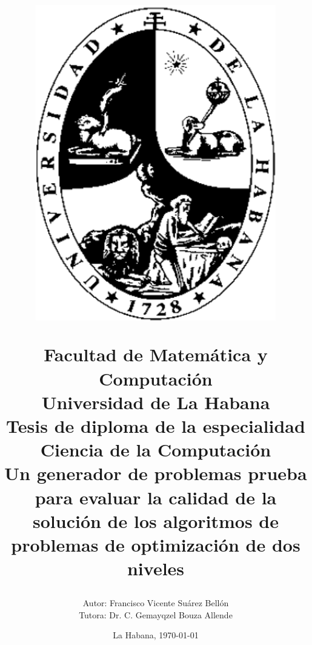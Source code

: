 \begin{titlepage}
	
	\title{\vspace*{-70pt}
		\begin{figure}
			\includegraphics[scale=0.2]{img/logo.png}
		\end{figure} 
		\vspace*{10pt}Facultad de Matemática y Computación \\
		Universidad de La Habana \\
		\vspace*{20pt}	
		Tesis de diploma de la especialidad \\ 
		Ciencia de la Computación \\
		
		\vspace*{20pt}
		Un generador de problemas prueba para evaluar la calidad de la solución de los algoritmos de problemas de optimización de dos niveles 
		\author{{\large Autor: Francisco Vicente Suárez Bellón \vspace*{15pt}} \\
			{\large Tutora: Dr. C. Gemayqzel Bouza Allende} \\ \hspace{10pt}  }
		
		\date{La Habana, \today}
	}
	
\end{titlepage}